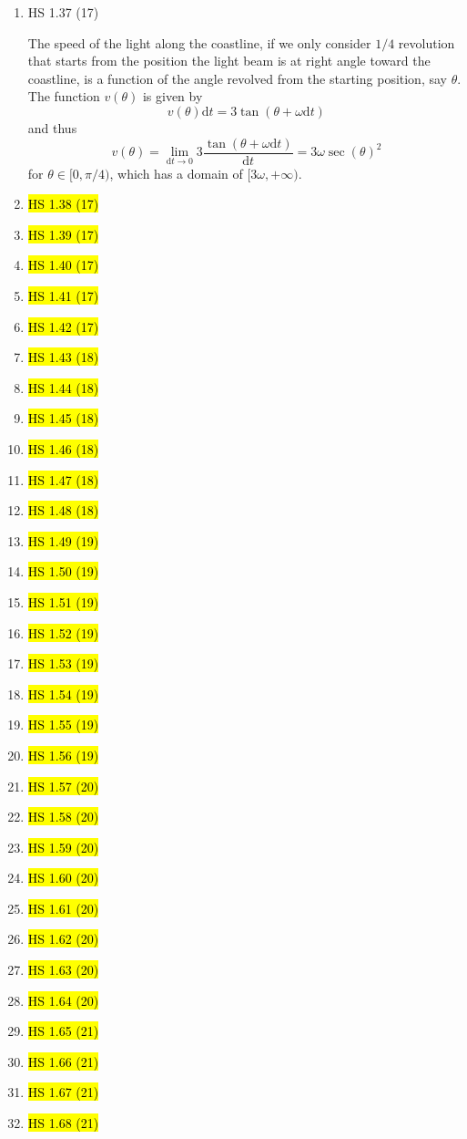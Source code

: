 \documentclass[11pt]{article}
\renewcommand{\d}{\text{d}}
\newenvironment{note}{\begin{enumerate}[leftmargin=1em,topsep=0pt,noitemsep]}{\end{enumerate}}
\newcommand{\solution}{\boxed{\textbf{SOLUTION}}\hspace{.5em}}
\begin{document}
\begin{spacing}{1.1}
\begin{note}
\item HS 1.37 (17)

\solution The speed of the light along the coastline, if we only consider $1/4$ revolution that starts from the position the light beam is at right angle toward the coastline, is a function of the angle revolved from the starting position, say $\theta$. The function $v(\theta)$ is given by
$$
v(\theta)\d t = 3\tan(\theta+\omega\d t)
$$
and thus
$$
v(\theta) = \lim_{\d t\to 0}3\frac{\tan(\theta+\omega\d t)}{\d t}=3\omega\sec(\theta)^2
$$
for $\theta\in[0,\pi/4)$, which has a domain of $[3\omega, +\infty)$.

\item \hl{HS 1.38 (17)}
\item \hl{HS 1.39 (17)}
\item \hl{HS 1.40 (17)}
\item \hl{HS 1.41 (17)}
\item \hl{HS 1.42 (17)}
\item \hl{HS 1.43 (18)}
\item \hl{HS 1.44 (18)}
\item \hl{HS 1.45 (18)}
\item \hl{HS 1.46 (18)}
\item \hl{HS 1.47 (18)}
\item \hl{HS 1.48 (18)}
\item \hl{HS 1.49 (19)}
\item \hl{HS 1.50 (19)}
\item \hl{HS 1.51 (19)}
\item \hl{HS 1.52 (19)}
\item \hl{HS 1.53 (19)}
\item \hl{HS 1.54 (19)}
\item \hl{HS 1.55 (19)}
\item \hl{HS 1.56 (19)}
\item \hl{HS 1.57 (20)}
\item \hl{HS 1.58 (20)}
\item \hl{HS 1.59 (20)}
\item \hl{HS 1.60 (20)}
\item \hl{HS 1.61 (20)}
\item \hl{HS 1.62 (20)}
\item \hl{HS 1.63 (20)}
\item \hl{HS 1.64 (20)}
\item \hl{HS 1.65 (21)}
\item \hl{HS 1.66 (21)}
\item \hl{HS 1.67 (21)}
\item \hl{HS 1.68 (21)}



\end{note}
\end{spacing}
\end{document}
